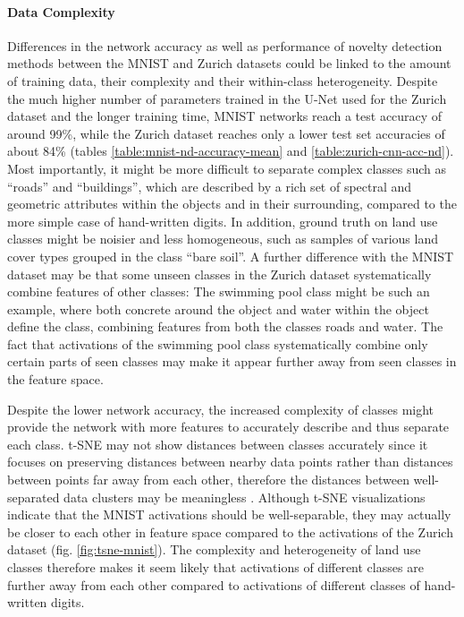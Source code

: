 \documentclass[10pt]{article}
\begin{document}
\paragraph{Data Complexity} Differences in the network accuracy as well as performance of novelty detection methods between the \gls{MNIST} and Zurich datasets could be linked to the amount of training data, their complexity and their within-class heterogeneity. Despite the much higher number of parameters trained in the U-Net used for the Zurich dataset and the longer training time,  \gls{MNIST} networks reach a test accuracy of around 99\%, while the Zurich dataset reaches only a lower test set accuracies of about 84\% (tables \ref{table:mnist-nd-accuracy-mean} and \ref{table:zurich-cnn-acc-nd}). Most importantly, it might be more difficult to separate complex classes such as ``roads'' and ``buildings'', which are described by a rich set of spectral and geometric attributes within the objects and in their surrounding, compared to the more simple case of hand-written digits. In addition, ground truth on land use classes might be noisier and less homogeneous, such as samples of various land cover types grouped in the class ``bare soil''.  A further difference with the \gls{MNIST} dataset may be that some unseen classes in the Zurich dataset systematically combine features of other classes: The swimming pool class might be such an example, where both concrete around the object and water within the object define the class, combining features from both the classes roads and water. The fact that activations of the swimming pool class systematically combine only certain parts of seen classes may make it appear further away from seen classes in the feature space. 

Despite the lower network accuracy, the increased complexity of classes might provide the network with more features to accurately describe and thus separate each class. \gls{t-SNE} may not show distances between classes accurately since it focuses on preserving distances between nearby data points rather than distances between points far away from each other, therefore the distances between well-separated data clusters may be meaningless \cite{Maaten2008VisualizingDU, wattenberg2016how}. Although \gls{t-SNE} visualizations indicate that the \gls{MNIST} activations should be well-separable, they may actually be closer to each other in feature space compared to the activations of the Zurich dataset (fig. \ref{fig:tsne-mnist}). The complexity and heterogeneity of land use classes therefore makes it seem likely that activations of different classes are further away from each other compared to activations of different classes of hand-written digits.
\end{document}
